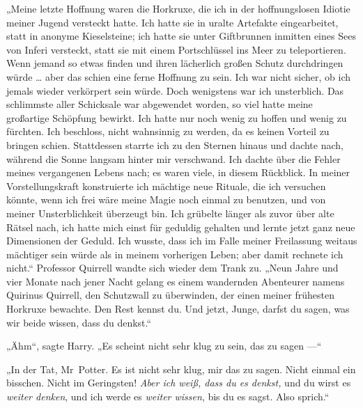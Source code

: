 „Meine letzte Hoffnung waren die Horkruxe, die ich in der hoffnungslosen Idiotie meiner Jugend versteckt hatte. Ich hatte sie in uralte Artefakte eingearbeitet, statt in anonyme Kieselsteine; ich hatte sie unter Giftbrunnen inmitten eines Sees von Inferi versteckt, statt sie mit einem Portschlüssel ins Meer zu teleportieren. Wenn jemand so etwas finden und ihren lächerlich großen Schutz durchdringen würde … aber das schien eine ferne Hoffnung zu sein. Ich war nicht sicher, ob ich jemals wieder verkörpert sein würde. Doch wenigstens war ich unsterblich. Das schlimmste aller Schicksale war abgewendet worden, so viel hatte meine großartige Schöpfung bewirkt. Ich hatte nur noch wenig zu hoffen und wenig zu fürchten. Ich beschloss, nicht wahnsinnig zu werden, da es keinen Vorteil zu bringen schien. Stattdessen starrte ich zu den Sternen hinaus und dachte nach, während die Sonne langsam hinter mir verschwand. Ich dachte über die Fehler meines vergangenen Lebens nach; es waren viele, in diesem Rückblick. In meiner Vorstellungskraft konstruierte ich mächtige neue Rituale, die ich versuchen könnte, wenn ich frei wäre meine Magie noch einmal zu benutzen, und von meiner Unsterblichkeit überzeugt bin. Ich grübelte länger als zuvor über alte Rätsel nach, ich hatte mich einst für geduldig gehalten und lernte jetzt ganz neue Dimensionen der Geduld. Ich wusste, dass ich im Falle meiner Freilassung weitaus mächtiger sein würde als in meinem vorherigen Leben; aber damit rechnete ich nicht.“
Professor Quirrell wandte sich wieder dem Trank zu.
„Neun Jahre und vier Monate nach jener Nacht gelang es einem wandernden Abenteurer namens Quirinus Quirrell, den Schutzwall zu überwinden, der einen meiner frühesten Horkruxe bewachte. Den Rest kennst du. Und jetzt, Junge, darfst du sagen, was wir beide wissen, dass du denkst.“

„Ähm“, sagte Harry.
„Es scheint nicht sehr klug zu sein, das zu sagen —“

„In der Tat, Mr~Potter. Es ist nicht sehr klug, mir das zu sagen. Nicht einmal ein bisschen. Nicht im Geringsten! \emph{Aber ich weiß, dass du es denkst,} und du wirst es \emph{weiter denken}, und ich werde es \emph{weiter wissen}, bis du es sagst. Also sprich.“


